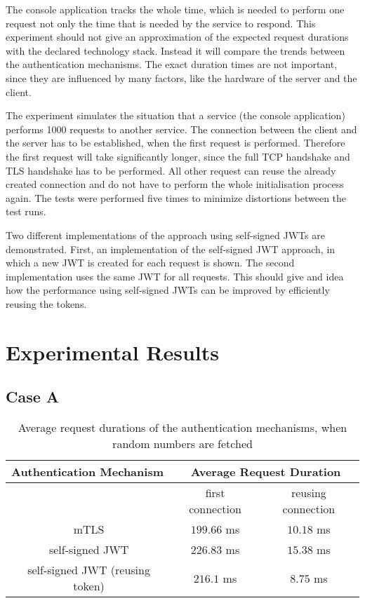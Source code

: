 The console application tracks the whole time, which is needed to perform one request not only the time that is needed by the service to respond.
This experiment should not give an approximation of the expected request durations with the declared technology stack.
Instead it will compare the trends between the authentication mechanisms.
The exact duration times are not important, since they are influenced by many factors, like the hardware of the server and the client.

The experiment simulates the situation that a service (the console application) performs 1000 requests to another service.
The connection between the client and the server has to be established, when the first request is performed.
Therefore the first request will take significantly longer, since the full TCP handshake and TLS handshake has to be performed.
All other request can reuse the already created connection and do not have to perform the whole initialisation process again.
The tests were performed five times to minimize distortions between the test runs.

Two different implementations of the approach using self-signed JWTs are demonstrated.
First, an implementation of the self-signed JWT approach, in which a new JWT is created for each request is shown.
The second implementation uses the same JWT for all requests.
This should give and idea how the performance using self-signed JWTs can be improved by efficiently reusing the tokens.


\section{Experimental Results}

\subsection{Case A}

\begin{table}[H]
\begin{tabular}{c|cc}
\multicolumn{1}{l|}{\textbf{Authentication Mechanism}} & \multicolumn{2}{c}{\textbf{Average Request Duration}} \\ \hline
\multicolumn{1}{c|}{} & \multicolumn{1}{c|}{first connection} & reusing connection \\ \hline
mTLS & \multicolumn{1}{c|}{$199.66$ ms} & $10.18$ ms \\ \hline
self-signed JWT & \multicolumn{1}{c|}{$226.83$ ms} & $15.38$ ms \\ \hline
self-signed JWT (reusing token) & \multicolumn{1}{c|}{$216.1$ ms} & $8.75$ ms
\end{tabular}
\caption{Average request durations of the authentication mechanisms, when random numbers are fetched}
\label{tab:experiment_case_1}
\end{table}

